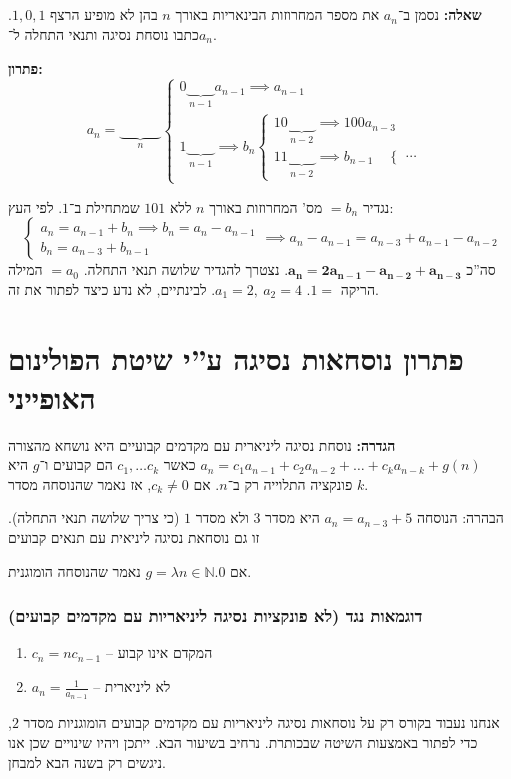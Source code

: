 \documentclass[]{article}
\newcommand\N     {\mathbb{N}}
\begin{document}
	\subsection{}
	\textbf{שאלה: }נסמן ב־$a_n $ את מספר המחרוזות הבינאריות באורך $n $ בהן לא מופיע הרצף $ 1, 0, 1 $. כתבו נוסחת נסיגה ותנאי התחלה ל־$a_n$. 
	
	\textbf{פתרון: }
	\[ a_n = \underbrace{\quad \quad \quad}_{n} \begin{cases}
		0\underbrace{\quad \quad}_{n - 1}a_{n - 1} \implies a_{n - 1} \\
		1\underbrace{\quad \quad}_{n - 1} \implies b_n\begin{cases}
			10\underbrace{\quad \quad}_{n - 2} \implies 100a_{n - 3} \\
			11\underbrace{\quad \quad}_{n - 2} \implies b_{n - 1} \quad \begin{cases}
				\cdots
			\end{cases}
		\end{cases}
	\end{cases} \]
	
	נגדיר $ = b_n $ מס' המחרוזות באורך $n$ ללא $101 $ שמתחילת ב־$1$. לפי העץ: 
	\[ \begin{cases}
		a_n = a_{n - 1} + b_n \implies b_n = a_n - a_{n - 1} \\
		b_n = a_{n - 3} + b_{n - 1}
	\end{cases} \implies a_n - a_{n - 1} = a_{n - 3} + a_{n - 1} - a_{n - 2} \]
	סה''כ $\bm{a_n = 2a_{n - 1} - a_{n - 2} + a_{n - 3}}$. 
	נצטרך להגדיר שלושה תנאי התחלה. $= a_0$ המילה הריקה $1 = $. $a_1 = 2, \ a_2 = 4 $. לבינתיים, לא נדע כיצד לפתור את זה. 
	
	\section{פתרון נוסחאות נסיגה ע''י שיטת הפולינום האופייני}
	\textbf{הגדרה: }נוסחת נסיגה ליניארית עם מקדמים קבועיים היא נושחא מהצורה $a_n = c_1a_{n - 1} + c_2a_{n - 2} + \dots + c_ka_{n - k} + g(n)$
	כאשר $c_1, \dots c_k $ הם קבועים ו־$g$ היא פונקציה התלוייה רק ב־$n$. 
	אם $c_k \neq 0 $, אז נאמר שהנוסחה מסדר $k$. 
	
	הבהרה: הנוסחה $a_n = a_{n - 3} + 5 $ היא מסדר $3$ ולא מסדר $1$ (כי צריך שלושה תנאי התחלה). זו גם נוסחאת נסיגה ליניאית עם תנאים קבועים
	
	אם $g = \lambda n \in \N. 0 $ נאמר שהנוסחה הומוגנית. 
	\subsubsection{דוגמאות נגד (לא פונקציות נסיגה ליניאריות עם מקדמים קבועים)}
	\begin{enumerate}
		\item $c_n = nc_{n - 1}$ – המקדם אינו קבוע 
		\item $a_n = \frac{1}{a_{n - 1}}$ – לא ליניארית
	\end{enumerate}
	
	אנחנו נעבוד בקורס רק על נוסחאות נסיגה ליניאריות עם מקדמים קבועים הומוגניות מסדר $2$, כדי לפתור באמצעות השיטה שבכותרת. נרחיב בשיעור הבא. ייתכן ויהיו שינויים שכן אנו ניגשים רק בשנה הבא למבחן. 
	
\end{document}
